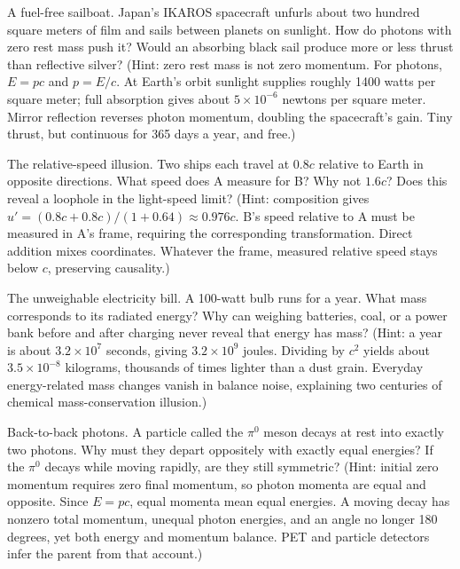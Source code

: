\begin{puzzles}
\item A fuel-free sailboat. Japan's IKAROS spacecraft unfurls about two hundred square meters of film and sails between planets on sunlight. How do photons with zero rest mass push it? Would an absorbing black sail produce more or less thrust than reflective silver? (Hint: zero rest mass is not zero momentum. For photons, \(E=pc\) and \(p=E/c\). At Earth's orbit sunlight supplies roughly 1400 watts per square meter; full absorption gives about \(5\times10^{-6}\) newtons per square meter. Mirror reflection reverses photon momentum, doubling the spacecraft's gain. Tiny thrust, but continuous for 365 days a year, and free.)
\item The relative-speed illusion. Two ships each travel at \(0.8c\) relative to Earth in opposite directions. What speed does A measure for B? Why not \(1.6c\)? Does this reveal a loophole in the light-speed limit? (Hint: composition gives \(u'=(0.8c+0.8c)/(1+0.64)\approx0.976c\). B's speed relative to A must be measured in A's frame, requiring the corresponding transformation. Direct addition mixes coordinates. Whatever the frame, measured relative speed stays below \(c\), preserving causality.)
\item The unweighable electricity bill. A 100-watt bulb runs for a year. What mass corresponds to its radiated energy? Why can weighing batteries, coal, or a power bank before and after charging never reveal that energy has mass? (Hint: a year is about \(3.2\times10^{7}\) seconds, giving \(3.2\times10^{9}\) joules. Dividing by \(c^{2}\) yields about \(3.5\times10^{-8}\) kilograms, thousands of times lighter than a dust grain. Everyday energy-related mass changes vanish in balance noise, explaining two centuries of chemical mass-conservation illusion.)
\item Back-to-back photons. A particle called the \(\pi^{0}\) meson decays at rest into exactly two photons. Why must they depart oppositely with exactly equal energies? If the \(\pi^{0}\) decays while moving rapidly, are they still symmetric? (Hint: initial zero momentum requires zero final momentum, so photon momenta are equal and opposite. Since \(E=pc\), equal momenta mean equal energies. A moving decay has nonzero total momentum, unequal photon energies, and an angle no longer 180 degrees, yet both energy and momentum balance. PET and particle detectors infer the parent from that account.)
\end{puzzles}

